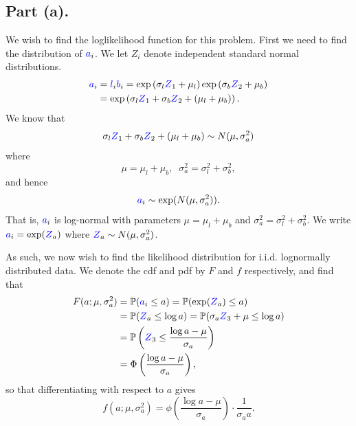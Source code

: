 \documentclass{article}
\renewcommand{\r}[1]{\textcolor{blue}{#1}}
\renewcommand{\P}{\mathbb{P}}
\begin{document}
\subsection{Part (a).}
We wish to find the loglikelihood function for this problem. First we need to find the distribution of $\r{a}_{i}$. We let $Z_{i}$ denote independent standard normal distributions.
\begin{equation}\begin{split}
\r{a}_{i} &= \r{l}_{i}\r{b}_{i} = \exp\left(\sigma_{l}\r{Z}_{1}+\mu_{l}\right)\exp\left(\sigma_{b}\r{Z}_{2}+\mu_{b}\right)\\
&=\exp\left(\sigma_{l}\r{Z}_{1}+\sigma_{b}\r{Z}_{2}+(\mu_{l}+\mu_{b})\right).\end{split}\end{equation}
We know that 
\begin{equation}\sigma_{l}\r{Z}_{1}+\sigma_{b}\r{Z}_{2}+(\mu_{l}+\mu_{b})\sim N(\mu,\sigma_{a}^{2})\end{equation}
where 
\begin{equation} \mu=\mu_{l}+\mu_{b}, \; \; \sigma_{a}^{2}=\sigma_{l}^{2}+\sigma_{b}^{2},\end{equation}
and hence 
\begin{equation}\r{a}_{i}\sim\exp(N(\mu,\sigma_{a}^{2})).\end{equation}
That is, $\r{a}_{i}$ is log-normal with parameters $\mu=\mu_{l}+\mu_{b}$ and $\sigma_{a}^{2}=\sigma_{l}^{2}+\sigma_{b}^{2}$. We write $\r{a}_{i}=\exp(\r{Z}_{a})$ where $\r{Z}_{a}\sim N(\mu,\sigma_{a}^{2})$.

As such, we now wish to find the likelihood distribution for i.i.d. lognormally distributed data. We denote the cdf and pdf by $F$ and $f$ respectively, and find that
\begin{equation}\begin{split}
F(a;\mu,\sigma_{a}^{2}) &= \P(\r{a}_{i}\leq a)=\P(\exp(\r{Z}_{a})\leq a) \\
&= \P(\r{Z}_{a}\leq \log a) = \P(\sigma_{a}\r{Z}_{3}+\mu \leq \log a)\\
&=\P\left(\r{Z}_{3}\leq \frac{\log a-\mu}{\sigma_{a}}\right)\\
&=\Phi\left(\frac{\log a-\mu}{\sigma_{a}}\right),
\end{split}\end{equation}
so that differentiating with respect to $a$ gives
\begin{equation}f(a;\mu,\sigma_{a}^{2}) = \phi\left(\frac{\log a -\mu}{\sigma_{a}}\right)\cdot\frac{1}{\sigma_{a}a}.\end{equation}
\end{document}
